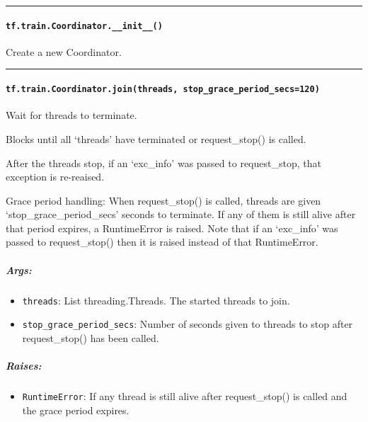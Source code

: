 \begin{center}\rule{0.5\linewidth}{\linethickness}\end{center}

\paragraph{\texorpdfstring{\texttt{tf.train.Coordinator.\_\_init\_\_()}
}{tf.train.Coordinator.\_\_init\_\_() }}\label{tf.train.coordinator.ux5fux5finitux5fux5f}

Create a new Coordinator.

\begin{center}\rule{0.5\linewidth}{\linethickness}\end{center}

\paragraph{\texorpdfstring{\texttt{tf.train.Coordinator.join(threads,\ stop\_grace\_period\_secs=120)}
}{tf.train.Coordinator.join(threads, stop\_grace\_period\_secs=120) }}\label{tf.train.coordinator.jointhreads-stopux5fgraceux5fperiodux5fsecs120}

Wait for threads to terminate.

Blocks until all `threads' have terminated or request\_stop() is called.

After the threads stop, if an `exc\_info' was passed to request\_stop,
that exception is re-reaised.

Grace period handling: When request\_stop() is called, threads are given
`stop\_grace\_period\_secs' seconds to terminate. If any of them is
still alive after that period expires, a RuntimeError is raised. Note
that if an `exc\_info' was passed to request\_stop() then it is raised
instead of that RuntimeError.

\subparagraph{Args: }\label{args-23}

\begin{itemize}
\tightlist
\item
  \texttt{threads}: List threading.Threads. The started threads to join.
\item
  \texttt{stop\_grace\_period\_secs}: Number of seconds given to threads
  to stop after request\_stop() has been called.
\end{itemize}

\subparagraph{Raises: }\label{raises-10}

\begin{itemize}
\tightlist
\item
  \texttt{RuntimeError}: If any thread is still alive after
  request\_stop() is called and the grace period expires.
\end{itemize}

